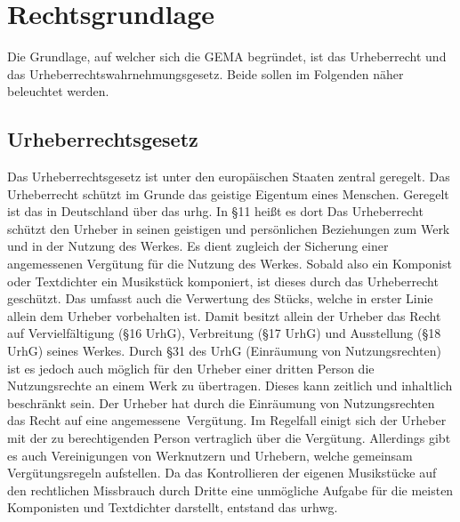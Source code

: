 \chapter{Rechtsgrundlage}
Die Grundlage, auf welcher sich die GEMA begründet, ist das Urheberrecht und das Urheberrechtswahrnehmungsgesetz. Beide sollen im Folgenden näher beleuchtet werden. 
\section{Urheberrechtsgesetz}
Das Urheberrechtsgesetz ist unter den europäischen Staaten zentral geregelt. Das Urheberrecht schützt im Grunde das geistige Eigentum eines Menschen. Geregelt ist das in Deutschland über das \gls{urhg}. In §11 heißt es dort \glqq Das Urheberrecht schützt den Urheber in seinen geistigen und persönlichen Beziehungen zum Werk und in der Nutzung des Werkes. Es dient zugleich der Sicherung einer angemessenen Vergütung für die Nutzung des Werkes.\grqq{} Sobald also ein Komponist oder Textdichter ein Musikstück komponiert, ist dieses durch das Urheberrecht geschützt. Das umfasst auch die Verwertung des Stücks, welche in erster Linie allein dem Urheber vorbehalten ist. Damit besitzt allein der Urheber das Recht auf Vervielfältigung (§16 UrhG), Verbreitung (§17 UrhG) und Ausstellung (§18 UrhG) seines Werkes. Durch §31 des UrhG (\glqq Einräumung von Nutzungsrechten\grqq) ist es jedoch auch möglich für den Urheber einer dritten Person die Nutzungsrechte an einem Werk zu übertragen. Dieses kann zeitlich und inhaltlich beschränkt sein. Der Urheber hat durch die Einräumung von Nutzungsrechten das Recht auf eine \glqq angemessene\grqq~Vergütung. Im Regelfall einigt sich der Urheber mit der zu berechtigenden Person vertraglich über die Vergütung. Allerdings gibt es auch Vereinigungen von Werknutzern und Urhebern, welche gemeinsam Vergütungsregeln aufstellen.
\newline
\newline
Da das Kontrollieren der eigenen Musikstücke auf den rechtlichen Missbrauch durch Dritte eine unmögliche Aufgabe für die meisten Komponisten und Textdichter darstellt, entstand das \gls{urhwg}. 
